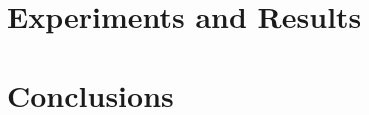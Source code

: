 \documentclass[
	letterpaper, %
	10pt, %
]{CSUniSchoolLabReport}
\begin{document}

\section{Experiments and Results }



\section{Conclusions}





\printbibliography %

\end{document}
